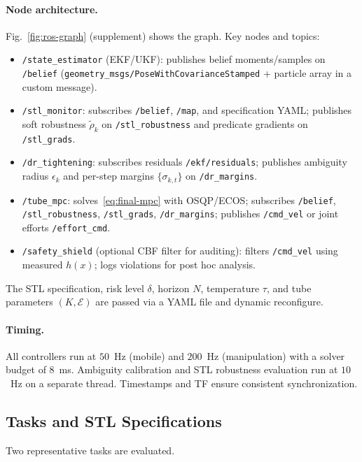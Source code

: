 \documentclass[journal]{IEEEtran}
\theoremstyle{definition}
\begin{document}
\paragraph*{Node architecture.}
Fig.~\ref{fig:ros-graph} (supplement) shows the graph. Key nodes and topics:
\begin{itemize}
  \item \texttt{/state\_estimator} (EKF/UKF): publishes belief moments/samples
        on \texttt{/belief} (\texttt{geometry\_msgs/PoseWithCovarianceStamped}
        + particle array in a custom message).
  \item \texttt{/stl\_monitor}: subscribes \texttt{/belief}, \texttt{/map},
        and specification YAML; publishes soft robustness $\widetilde{\rho}_k$ on
        \texttt{/stl\_robustness} and predicate gradients on \texttt{/stl\_grads}.
  \item \texttt{/dr\_tightening}: subscribes residuals \texttt{/ekf/residuals};
        publishes ambiguity radius $\epsilon_k$ and per-step margins $\{\sigma_{k,t}\}$
        on \texttt{/dr\_margins}.
  \item \texttt{/tube\_mpc}: solves~\eqref{eq:final-mpc} with OSQP/ECOS;
        subscribes \texttt{/belief}, \texttt{/stl\_robustness}, \texttt{/stl\_grads},
        \texttt{/dr\_margins}; publishes \texttt{/cmd\_vel} or joint efforts \texttt{/effort\_cmd}.
  \item \texttt{/safety\_shield} (optional CBF filter for auditing): filters \texttt{/cmd\_vel}
        using measured $h(x)$; logs violations for post hoc analysis.
\end{itemize}
The STL specification, risk level $\delta$, horizon $N$, temperature $\tau$, and tube parameters $(K,\mathcal{E})$
are passed via a YAML file and dynamic reconfigure.

\paragraph*{Timing.}
All controllers run at $50$~Hz (mobile) and $200$~Hz (manipulation) with a solver budget of 8~ms.
Ambiguity calibration and STL robustness evaluation run at $10$~Hz on a separate thread.
Timestamps and TF ensure consistent synchronization.

\subsection{Tasks and STL Specifications}
Two representative tasks are evaluated.
\end{document}
